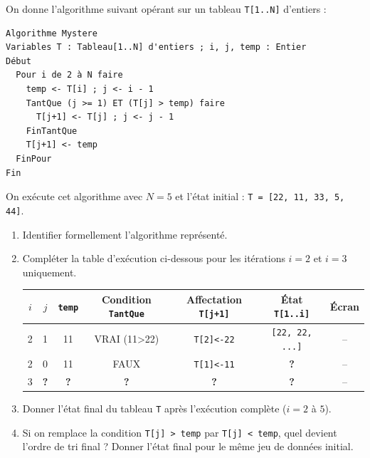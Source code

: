 \documentclass[11pt]{article}
\begin{document}
\begin{exercice}
On donne l'algorithme suivant opérant sur un tableau \texttt{T[1..N]} d'entiers :
\begin{verbatim}
Algorithme Mystere
Variables T : Tableau[1..N] d'entiers ; i, j, temp : Entier
Début
  Pour i de 2 à N faire
    temp <- T[i] ; j <- i - 1
    TantQue (j >= 1) ET (T[j] > temp) faire
      T[j+1] <- T[j] ; j <- j - 1
    FinTantQue
    T[j+1] <- temp
  FinPour
Fin
\end{verbatim}
On exécute cet algorithme avec $N=5$ et l'état initial : \texttt{T = [22, 11, 33, 5, 44]}.

\begin{enumerate}
    \item Identifier formellement l'algorithme représenté.
    \item Compléter la table d'exécution ci-dessous pour les itérations $i=2$ et $i=3$ uniquement.
    \begin{center}
    \begin{tabular}{|c|c|c|c|c|c|c|}
    \hline
    $i$ & $j$ & \texttt{temp} & Condition \texttt{TantQue} & Affectation \texttt{T[j+1]} & État \texttt{T[1..i]} & Écran \\ \hline
    2 & 1 & 11 & VRAI (11>22) & \texttt{T[2]<-22} & \texttt{[22, 22, ...]} & -- \\ \hline
    2 & 0 & 11 & FAUX & \texttt{T[1]<-11} & \textbf{?} & -- \\ \hline
    3 & \textbf{?} & \textbf{?} & \textbf{?} & \textbf{?} & \textbf{?} & -- \\ \hline
    \end{tabular}
    \end{center}
    \item Donner l'état final du tableau \texttt{T} après l'exécution complète ($i=2$ à $5$).
    \item Si on remplace la condition \texttt{T[j] > temp} par \texttt{T[j] < temp}, quel devient l'ordre de tri final ? Donner l'état final pour le même jeu de données initial.
\end{enumerate}
\end{exercice}
\end{document}
